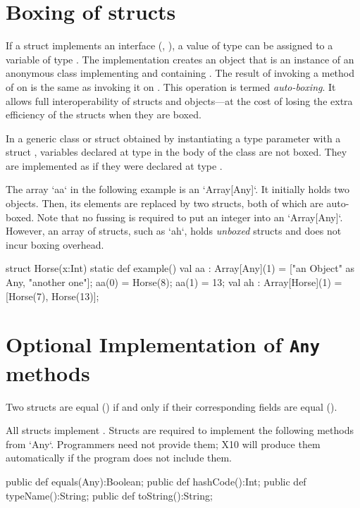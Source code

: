 \section{Boxing of structs}
\label{auto-boxing} 
If a struct  implements an interface  (\eg, ),
a value  of type  can be assigned to a variable of type
. The implementation creates an object  that is an
instance of an anonymous class implementing  and containing
.  The result of invoking a method of  on  is the
same as invoking it on . This operation is termed {\em auto-boxing}.
It allows full interoperability of structs and objects---at the cost of losing
the extra efficiency of the structs when they are boxed.

In a generic class or struct obtained by instantiating a type parameter
 with a struct , variables declared at type  in the body
of the class are not boxed. They are implemented as if they were declared at
type .

\begin{ex}
The array \xcd`aa` in the following example is an \xcd`Array[Any]`.  It
initially holds two objects.  Then, its elements are replaced by two structs,
both of which are auto-boxed.  Note that no fussing is required to put an
integer into an \xcd`Array[Any]`.  
However, an array of structs, such as \xcd`ah`, holds {\em unboxed} structs
and does not incur boxing overhead.
\begin{xten}
struct Horse(x:Int){
  static def example(){
    val aa : Array[Any](1) = ["an Object" as Any, "another one"];
    aa(0) = Horse(8);
    aa(1) = 13;
    val ah : Array[Horse](1) = [Horse(7), Horse(13)];
  }
}
\end{xten}
%


\end{ex}

\section{Optional Implementation of {\tt Any} methods}
\label{StructAnyMethods}

Two
structs are equal (\Xcd{==}) if and only if their corresponding fields
are equal (\Xcd{==}). 

All structs implement . 
Structs are required to implement the following methods from \xcd`Any`.  
Programmers need not provide them; X10 will produce them automatically if 
the program does not include them. 
\begin{xten}
  public def equals(Any):Boolean;
  public def hashCode():Int;
  public def typeName():String;
  public def toString():String;  
\end{xten}


